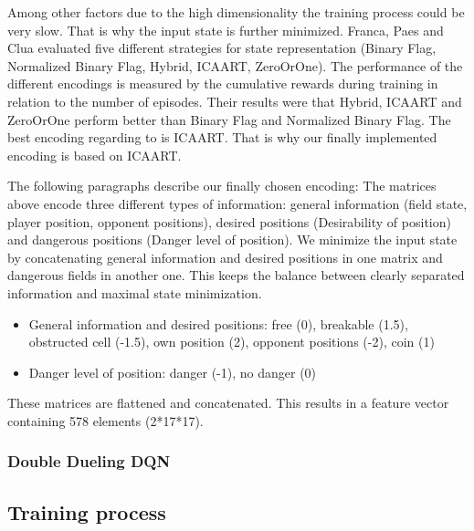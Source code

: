 Among other factors due to the high dimensionality the training process could be very slow. That is why the input state is further minimized.
Franca, Paes and Clua \cite{Franca2019} evaluated five different strategies for state representation (Binary Flag, Normalized Binary Flag, Hybrid, ICAART, ZeroOrOne). The performance of the different encodings is measured by the cumulative rewards during training in relation to the number of episodes. Their results were that Hybrid, ICAART and ZeroOrOne perform better than Binary Flag and Normalized Binary Flag. The best encoding regarding to \cite{Franca2019} is ICAART. That is why our finally implemented encoding is based on ICAART.

The following paragraphs describe our finally chosen encoding:
The matrices above encode three different types of information:
general information (field state, player position, opponent positions), desired positions (Desirability of position) and dangerous positions (Danger level of position).
We minimize the input state by concatenating general information and desired positions in one matrix and dangerous fields in another one. This keeps the balance between clearly separated information and maximal state minimization.

\begin{itemize}
	\item General information and desired positions: free (0), breakable (1.5), obstructed cell (-1.5), own position (2), opponent positions (-2), coin (1)
	\item Danger level of position: danger (-1), no danger (0)
\end{itemize}
These matrices are flattened and concatenated. This results in a feature vector containing 578 elements (2*17*17).


\subsubsection{Double Dueling DQN}
\label{ch:approachAb}



\subsection{Training process} 
\label{ch:approachB}


